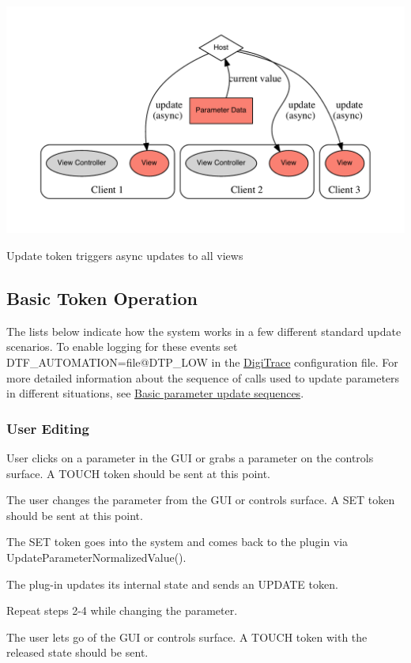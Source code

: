 \begin{DoxyImage}
\includegraphics[width=\textwidth,height=\textheight/2,keepaspectratio=true]{dot_aax_parameter_entities_curvalue}
\caption{Update token triggers async updates to all views}
\end{DoxyImage}


 \hypertarget{a00352_tokenProtocol_standardTokenOperation}{}\subsection{Basic Token Operation}\label{a00352_tokenProtocol_standardTokenOperation}
The lists below indicate how the system works in a few different standard update scenarios. To enable logging for these events set {\ttfamily D\+T\+F\+\_\+\+A\+U\+T\+O\+M\+A\+T\+I\+O\+N=file@D\+T\+P\+\_\+\+L\+O\+W} in the \hyperlink{a00364}{Digi\+Trace} configuration file. For more detailed information about the sequence of calls used to update parameters in different situations, see \hyperlink{a00353}{Basic parameter update sequences}.

\hypertarget{a00352_tokenProtocol_standardTokenOperation_userEditing}{}\subsubsection{User Editing}\label{a00352_tokenProtocol_standardTokenOperation_userEditing}

\begin{DoxyEnumerate}
\item User clicks on a parameter in the G\+U\+I or grabs a parameter on the controls surface. A T\+O\+U\+C\+H token should be sent at this point.
\item The user changes the parameter from the G\+U\+I or controls surface. A S\+E\+T token should be sent at this point.
\item The S\+E\+T token goes into the system and comes back to the plugin via Update\+Parameter\+Normalized\+Value().
\item The plug-\/in updates it\textquotesingle{}s internal state and sends an U\+P\+D\+A\+T\+E token.
\item Repeat steps 2-\/4 while changing the parameter.
\item The user lets go of the G\+U\+I or controls surface. A T\+O\+U\+C\+H token with the released state should be sent.
\end{DoxyEnumerate}

